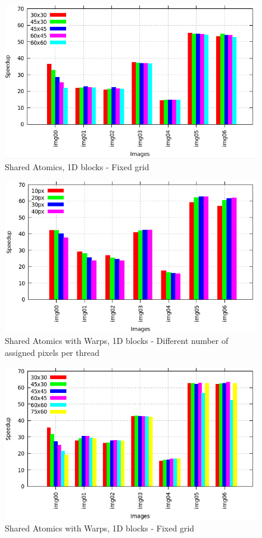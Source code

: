 \documentclass[a4paper]{article}
\begin{document}
\begin{figure}[!ht]
    \centering
    \includegraphics[width=0.65\linewidth]{res/new/histogram_uni_fixed}
    \caption{Shared Atomics, 1D blocks - Fixed grid}
    \label{fig:hfm}
\end{figure}
\FloatBarrier

\begin{figure}[!ht]
    \centering
    \includegraphics[width=0.65\linewidth]{res/new/histogram_warp_more}
    \caption{Shared Atomics with Warps, 1D blocks - Different number of assigned pixels per thread}
    \label{fig:hwm}
\end{figure}
\FloatBarrier

\begin{figure}[!ht]
    \centering
    \includegraphics[width=0.7\linewidth]{res/new/histogram_warp_fixed}
    \caption{Shared Atomics with Warps, 1D blocks - Fixed grid}
    \label{fig:hwf}
\end{figure}
\FloatBarrier
\end{document}
